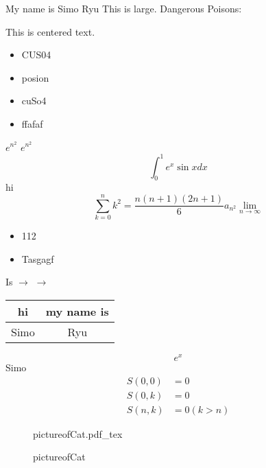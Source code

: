 \documentclass[12pt]{article}
\newcommand{\ee}[1]{$e^{#1}$}
\newcommand{\ra}{$\rightarrow$}
\begin{document}
My name is Simo Ryu
{\tiny This is large.}
Dangerous Poisons:
\begin{center}
  This is centered text.
\end{center}
\begin{itemize}
  \item CUS04
  \item posion
\end{itemize}

\begin{itemize}
  \item cuSo4
  \item ffafaf
\end{itemize}
$e^{n^2}$
\ee{n^2}
\[
\int_{0}^{1} e^x \sin x dx
\]
hi
\[
\sum_{k=0}^{n} k^2 = \frac{n(n+1)(2n+1)}{6} a_{n^2} \lim_{n \rightarrow \infty}
\]
\begin{center}
\begin{itemize}
  \item 112


\end{itemize}
\end{center}

\begin{center}
  \begin{itemize}
    \item Tasgagf
  \end{itemize}

\end{center}

\noindent
Is
$\rightarrow$ \ra
\begin{tabular}{|c|c|}
  \hline
  hi & my name is \\
  \hline
  Simo & Ryu \\
  \hline
\end{tabular}

\begin{equation}
  e^x
\end{equation}
Simo
\begin{align*}
S(0,0) &= 0 \\
S(0,k) &= 0 \\
S(n,k) &= 0  (k>n)
\end{align*}

\begin{figure}[H]
	\centering
	\def\svgwidth{\columnwidth}
	{pictureofCat.pdf_tex}
	\caption{pictureofCat}
	\label{fig:pictureofCat}
\end{figure}
\end{document}
